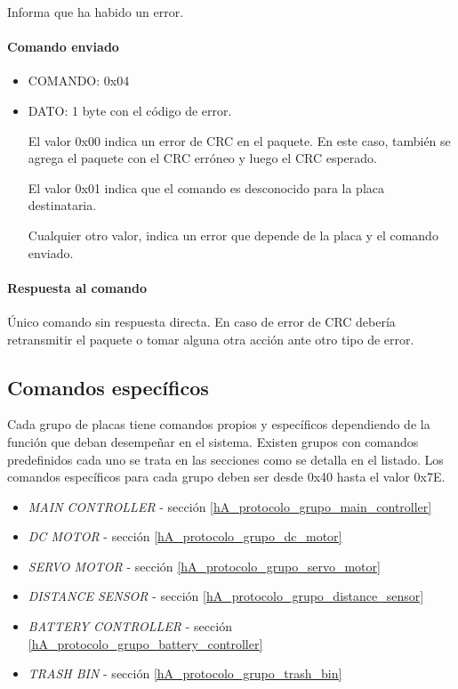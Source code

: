 Informa que ha habido un error.

\paragraph*{Comando enviado}
\label{hA_protocolo_error_comando_enviado}

\begin{itemize}
	\item{COMANDO:} 0x04
	\item{DATO:} 1 byte con el c\'odigo de error.

	El valor 0x00 indica un error de CRC en el paquete. 
	En este caso, tambi\'en se agrega el paquete con el CRC err\'oneo y luego el CRC esperado.

	El valor 0x01 indica que el comando es desconocido para la placa destinataria.

	Cualquier otro valor, indica un error que depende de la placa y el comando enviado.
\end{itemize}

\paragraph*{Respuesta al comando}
\label{hA_protocolo_error_respuesta}

\'Unico comando sin respuesta directa.
En caso de error de CRC deber\'ia retransmitir el paquete o tomar alguna otra acci\'on ante otro tipo de error.

\subsection{Comandos espec\'ificos}
\label{hA_protocolo_comandos_especificos}

Cada grupo de placas tiene comandos propios y espec\'ificos dependiendo de la funci\'on que deban desempe\~nar en el sistema.
Existen grupos con comandos predefinidos cada uno se trata en las secciones como se detalla en el listado.
Los comandos espec\'ificos para cada grupo deben ser desde 0x40 hasta el valor 0x7E.

\begin{itemize}
	\item \emph{MAIN CONTROLLER} - secci\'on \ref{hA_protocolo_grupo_main_controller}
	\item \emph{DC MOTOR} - secci\'on \ref{hA_protocolo_grupo_dc_motor}
	\item \emph{SERVO MOTOR} - secci\'on \ref{hA_protocolo_grupo_servo_motor}
	\item \emph{DISTANCE SENSOR} - secci\'on \ref{hA_protocolo_grupo_distance_sensor}
	\item \emph{BATTERY CONTROLLER} - secci\'on \ref{hA_protocolo_grupo_battery_controller}
	\item \emph{TRASH BIN} - secci\'on \ref{hA_protocolo_grupo_trash_bin}
\label{hA_protocolo_grupos_listado}
\end{itemize}


